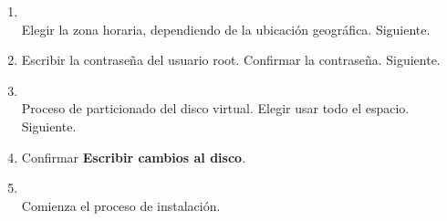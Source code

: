 \documentclass[11pt]{article}
\begin{document}
\begin{enumerate}
			\item 
				\begin{minipage}[t]{\linewidth}
			          \raggedright
			          \medskip
			          \\Elegir la zona horaria, dependiendo de la ubicación geográfica. Siguiente. 
			    \end{minipage}	
			
			\item Escribir la contraseña del usuario root. Confirmar la contraseña. Siguiente.
			\item 
				\begin{minipage}[t]{\linewidth}
			          \raggedright
			          \medskip
			          \\Proceso de particionado del disco virtual. Elegir usar todo el espacio. Siguiente. 
			    \end{minipage}	

			\item Confirmar \textbf{Escribir cambios al disco}.

			\item 
				\begin{minipage}[t]{\linewidth}
			        \raggedright
			        \medskip
			        \\Comienza el proceso de instalación. 
		        \end{minipage}	


\end{enumerate}
\end{document}
